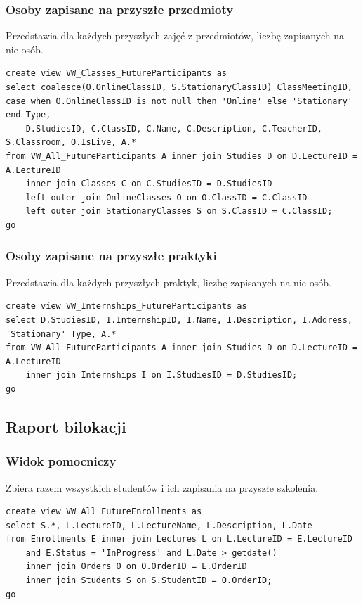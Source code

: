 \documentclass[11pt,a4paper]{article}
\begin{document}
\subsubsection{Osoby zapisane na przyszłe przedmioty}
Przedstawia dla każdych przyszłych zajęć z przedmiotów, liczbę zapisanych na nie osób.
\begin{Verbatim}[breaklines=true]
create view VW_Classes_FutureParticipants as
select coalesce(O.OnlineClassID, S.StationaryClassID) ClassMeetingID,  case when O.OnlineClassID is not null then 'Online' else 'Stationary' end Type,
    D.StudiesID, C.ClassID, C.Name, C.Description, C.TeacherID, S.Classroom, O.IsLive, A.*
from VW_All_FutureParticipants A inner join Studies D on D.LectureID = A.LectureID
    inner join Classes C on C.StudiesID = D.StudiesID
    left outer join OnlineClasses O on O.ClassID = C.ClassID
    left outer join StationaryClasses S on S.ClassID = C.ClassID;
go
\end{Verbatim}

\subsubsection{Osoby zapisane na przyszłe praktyki}
Przedstawia dla każdych przyszłych praktyk, liczbę zapisanych na nie osób.
\begin{Verbatim}[breaklines=true]
create view VW_Internships_FutureParticipants as
select D.StudiesID, I.InternshipID, I.Name, I.Description, I.Address, 'Stationary' Type, A.*
from VW_All_FutureParticipants A inner join Studies D on D.LectureID = A.LectureID
    inner join Internships I on I.StudiesID = D.StudiesID;
go
\end{Verbatim}

\subsection{Raport bilokacji}

\subsubsection{Widok pomocniczy}
Zbiera razem wszystkich studentów i ich zapisania na przyszłe szkolenia.
\begin{Verbatim}[breaklines=true]
create view VW_All_FutureEnrollments as
select S.*, L.LectureID, L.LectureName, L.Description, L.Date
from Enrollments E inner join Lectures L on L.LectureID = E.LectureID
    and E.Status = 'InProgress' and L.Date > getdate()
    inner join Orders O on O.OrderID = E.OrderID
    inner join Students S on S.StudentID = O.OrderID;
go
\end{Verbatim}
\end{document}

